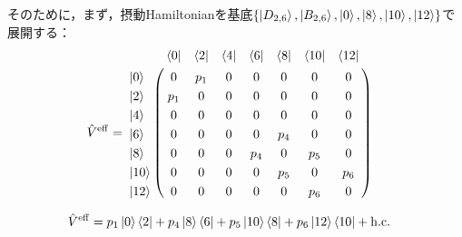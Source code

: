

そのために，まず，摂動Hamiltonianを基底$\{\ket{D_{2,6}},\ket{B_{2,6}},\ket{0},\ket{8},\ket{10},\ket{12}\}$で展開する：
\begin{align}
  \hat{V}^{\rm{eff}}&=
   \bordermatrix{     
    & \bra{0} &  \bra{2} &  \bra{4}&  \bra{6}&  \bra{8} &\bra{10} &\bra{12}\cr
   \ket{0}&0&p_1&0&0&0&0&0\cr
  \ket{2}&p_1&0&0&0&0&0&0\cr
  \ket{4}&0&0&0&0&0&0&0\cr
  \ket{6}&0&0&0&0&p_4&0&0\cr
  \ket{8}&0&0&0&p_4&0&p_5&0\cr
  \ket{10}&0&0&0&0&p_5&0&p_6\cr
  \ket{12}&0&0&0&0&0&p_6&0\cr}
\end{align}

\begin{align}
  \hat{V}^{\rm{eff}}&=
    p_1\ket{0}\bra{2} + p_4\ket{8}\bra{6}
    + p_5\ket{10}\bra{8}
    + p_6\ket{12}\bra{10}+ {\rm{h.c.}}
\end{align}



